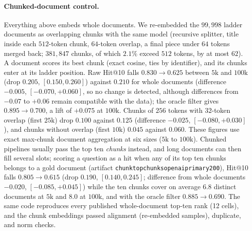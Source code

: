 \documentclass{ieeeaccess}
\makeatletter
\DeclareRobustCommand{\_}{\ifmmode\nfss@text{\textunderscore}\else\textunderscore\allowbreak\fi}
\makeatother
\begin{document}
\paragraph{Chunked-document control.}
\label{sec:chunk}
Everything above embeds whole documents. We re-embedded the $99{,}998$ ladder documents as overlapping chunks with the same model (recursive splitter, title inside each $512$-token chunk, $64$-token overlap, a final piece under $64$ tokens merged back; $381{,}847$ chunks, of which $2.1\%$ exceed $512$ tokens, by at most $62$). A document scores its best chunk (exact cosine, ties by identifier), and its chunks enter at its ladder position. Raw Hit@10 falls $0.830{\to}0.625$ between $5\text{k}$ and $100\text{k}$ (drop $0.205$, $[0.150,0.260]$) against $0.210$ for whole documents (difference $-0.005$, $[-0.070,+0.060]$, so no change is detected, although differences from $-0.07$ to $+0.06$ remain compatible with the data); the oracle filter gives $0.895{\to}0.700$, a lift of $+0.075$ at $100\text{k}$. Chunks of $256$ tokens with $32$-token overlap (first $25\text{k}$) drop $0.100$ against $0.125$ (difference $-0.025$, $[-0.080,+0.030]$), and chunks without overlap (first $10\text{k}$) $0.045$ against $0.060$. These figures use exact max-chunk document aggregation at six sizes ($5\text{k}$ to $100\text{k}$). Chunked pipelines usually pass the top ten \emph{chunks} instead, and long documents can then fill several slots; scoring a question as a hit when any of its top ten chunks belongs to a gold document (artifact \texttt{chunk\_topchunks\_openai\_primary200}), Hit@10 falls $0.805{\to}0.615$ (drop $0.190$, $[0.140,0.245]$; difference from whole documents $-0.020$, $[-0.085,+0.045]$) while the ten chunks cover on average $6.8$ distinct documents at $5\text{k}$ and $8.0$ at $100\text{k}$, and with the oracle filter $0.885{\to}0.690$. The same code reproduces every published whole-document top-ten rank (12 cells), and the chunk embeddings passed alignment (re-embedded samples), duplicate, and norm checks.
\end{document}
